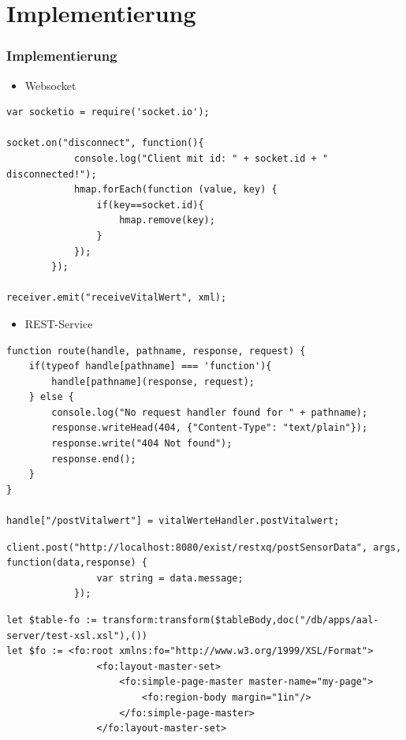 \documentclass{beamer}
\begin{document}
\section{Implementierung}
\begin{frame}[fragile]
\frametitle{Implementierung}
\begin{itemize}
	\item Websocket
\end{itemize}
\begin{lstlisting}
var socketio = require('socket.io');

socket.on("disconnect", function(){
            console.log("Client mit id: " + socket.id + " disconnected!");
            hmap.forEach(function (value, key) {
                if(key==socket.id){
                    hmap.remove(key);
                }
            });
        });
        
receiver.emit("receiveVitalWert", xml);
\end{lstlisting}
\end{frame}

\begin{frame}[fragile]
\begin{itemize}
	\item REST-Service
\end{itemize}
\begin{lstlisting}
function route(handle, pathname, response, request) {
    if(typeof handle[pathname] === 'function'){
        handle[pathname](response, request);
    } else {
        console.log("No request handler found for " + pathname);
        response.writeHead(404, {"Content-Type": "text/plain"});
        response.write("404 Not found");
        response.end();
    }
}

handle["/postVitalwert"] = vitalWerteHandler.postVitalwert;
\end{lstlisting}

\end{frame}

\begin{frame}[fragile]
\begin{lstlisting}
client.post("http://localhost:8080/exist/restxq/postSensorData", args, function(data,response) {
                var string = data.message;
            });
\end{lstlisting}
\end{frame}

\begin{frame}[fragile]
\begin{lstlisting}
let $table-fo := transform:transform($tableBody,doc("/db/apps/aal-server/test-xsl.xsl"),())
let $fo := <fo:root xmlns:fo="http://www.w3.org/1999/XSL/Format">
                <fo:layout-master-set>
                    <fo:simple-page-master master-name="my-page">
                        <fo:region-body margin="1in"/>
                    </fo:simple-page-master>
                </fo:layout-master-set>
   
\end{lstlisting}
\end{frame}   
                
\end{document}
